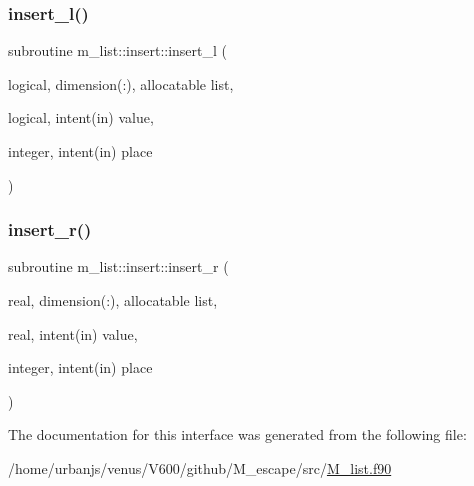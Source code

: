 \subsubsection{\texorpdfstring{insert\+\_\+l()}{insert\_l()}}
{\footnotesize\ttfamily subroutine m\+\_\+list\+::insert\+::insert\+\_\+l (\begin{DoxyParamCaption}\item[{logical, dimension(\+:), allocatable}]{list,  }\item[{logical, intent(in)}]{value,  }\item[{integer, intent(in)}]{place }\end{DoxyParamCaption})\hspace{0.3cm}{\ttfamily [private]}}

\mbox{\label{interfacem__list_1_1insert_a644fd8539d1489bb0e1c45f5da42ecb4}} 
\subsubsection{\texorpdfstring{insert\+\_\+r()}{insert\_r()}}
{\footnotesize\ttfamily subroutine m\+\_\+list\+::insert\+::insert\+\_\+r (\begin{DoxyParamCaption}\item[{real, dimension(\+:), allocatable}]{list,  }\item[{real, intent(in)}]{value,  }\item[{integer, intent(in)}]{place }\end{DoxyParamCaption})\hspace{0.3cm}{\ttfamily [private]}}



The documentation for this interface was generated from the following file\+:\begin{DoxyCompactItemize}
\item 
/home/urbanjs/venus/\+V600/github/\+M\+\_\+escape/src/\mbox{\hyperlink{M__list_8f90}{M\+\_\+list.\+f90}}\end{DoxyCompactItemize}
